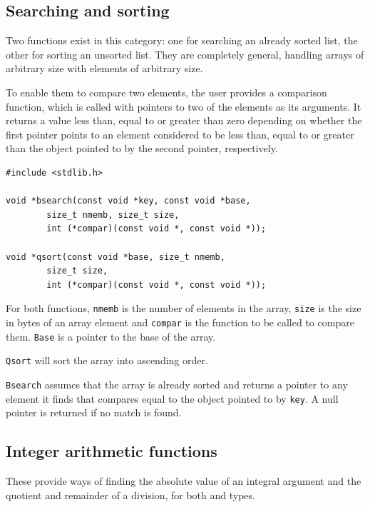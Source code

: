   

  \subsection{Searching and sorting}
   

   Two functions exist in this category: one for searching an already sorted
    list, the other for sorting an unsorted list.  They are completely general,
    handling arrays of arbitrary size with elements of arbitrary size.


   To enable them to compare two elements, the user provides a comparison
    function, which is called with pointers to two of the elements as its
    arguments.  It returns a value less than, equal to or greater than zero
    depending on whether the first pointer points to an element considered to
    be less than, equal to or greater than the object pointed to by the second
    pointer, respectively.


   \begin{Verbatim}
#include <stdlib.h>

void *bsearch(const void *key, const void *base,
        size_t nmemb, size_t size,
        int (*compar)(const void *, const void *));

void *qsort(const void *base, size_t nmemb,
        size_t size,
        int (*compar)(const void *, const void *));
\end{Verbatim}

   For both functions, \texttt{nmemb} is the number of elements  in  the
    array,  \texttt{size}  is  the  size in bytes of an array element and
    \texttt{compar} is the function to be called to compare  them.
    \texttt{Base} is a pointer to the base of the array.


   \texttt{Qsort} will sort the array into ascending order.


   \texttt{Bsearch} assumes that the array is already sorted and returns
    a pointer to any element it finds that compares equal to the object pointed
    to by \texttt{key}.  A null pointer is returned if  no match is
    found.


  

  \subsection{Integer arithmetic functions}
   

   These provide ways of finding the absolute value of an integral argument
    and the quotient and remainder of a division, for both \kint{} and
    \klong{} types.


